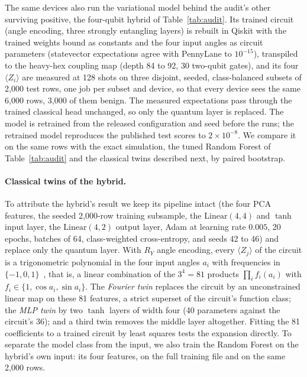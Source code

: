 The same devices also run the variational model behind the audit's other surviving positive, the
four-qubit hybrid of Table~\ref{tab:audit}. Its trained circuit (angle encoding, three strongly
entangling layers) is rebuilt in Qiskit with the trained weights bound as constants and the four input
angles as circuit parameters (statevector expectations agree with PennyLane to $10^{-15}$), transpiled to
the heavy-hex coupling map (depth 84 to 92, 30 two-qubit gates), and its four $\langle Z_i\rangle$ are
measured at 128 shots on three disjoint, seeded, class-balanced subsets of 2{,}000 test rows, one job per
subset and device, so that every device sees the same 6{,}000 rows, 3{,}000 of them benign. The measured
expectations pass through the trained classical head unchanged, so only the quantum layer is replaced.
The model is retrained from the released configuration and seed before the runs; the retrained model
reproduces the published test scores to $2\times10^{-8}$. We compare it on the same rows with the exact
simulation, the tuned Random Forest of Table~\ref{tab:audit} and the classical twins described next, by
paired bootstrap.

\paragraph{Classical twins of the hybrid.} To attribute the hybrid's result we keep its pipeline intact
(the four PCA features, the seeded 2{,}000-row training subsample, the $\mathrm{Linear}(4,4)$ and $\tanh$
input layer, the $\mathrm{Linear}(4,2)$ output layer, Adam at learning rate $0.005$, 20 epochs, batches
of 64, class-weighted cross-entropy, and seeds 42 to 46) and replace only the quantum layer. With $R_Y$
angle encoding, every $\langle Z_j\rangle$ of the circuit is a trigonometric polynomial in the four input
angles $a_i$ with frequencies in $\{-1,0,1\}$~\cite{schuld2021encoding}, that is, a linear combination of
the $3^4=81$ products $\prod_i f_i(a_i)$ with $f_i\in\{1,\cos a_i,\sin a_i\}$. The \emph{Fourier twin}
replaces the circuit by an unconstrained linear map on these 81 features, a strict superset of the
circuit's function class; the \emph{MLP twin} by two $\tanh$ layers of width four (40 parameters against
the circuit's 36); and a third twin removes the middle layer altogether. Fitting the 81 coefficients to a
trained circuit by least squares tests the expansion directly. To separate the model class from the
input, we also train the Random Forest on the hybrid's own input: its four features, on the full
training file and on the same 2{,}000 rows.
